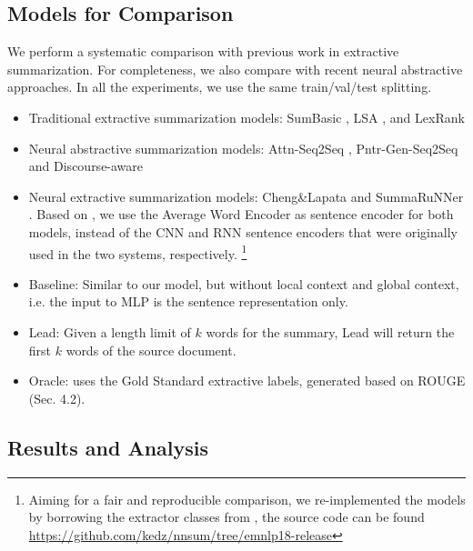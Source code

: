 \subsection{Models for Comparison}
We perform a systematic comparison with previous work in extractive summarization. For completeness, we also compare with recent neural abstractive approaches. In all the experiments, we use the same train/val/test splitting. 
\begin{itemize}
\setlength\itemsep{-0.3em}
\item Traditional extractive summarization models: SumBasic \cite{sumbasic}, LSA \cite{lsa}, and LexRank \cite{lexrank}
\item Neural abstractive summarization models: Attn-Seq2Seq \cite{RNN_beyond}, Pntr-Gen-Seq2Seq \cite{get_to_the_point} and Discourse-aware \cite{discourse_long_document}
\item Neural extractive summarization models: 
    Cheng\&Lapata \cite{cheng&lapata} and SummaRuNNer \cite{summarunner}. Based on 
    \cite{EMNLP2018}, we use the Average Word Encoder as sentence encoder for both models, instead of the CNN and RNN sentence encoders that were originally used in the two systems, respectively.
    \footnote{Aiming for a fair and reproducible comparison, we re-implemented the models by borrowing the extractor classes from \cite{EMNLP2018}, the source code can be found \url{https://github.com/kedz/nnsum/tree/emnlp18-release}}
\item Baseline: Similar to our model, but without local context and global context, i.e. the input to MLP is the sentence representation only.
\item Lead: Given a length limit of $k$ words for the summary, Lead will return the first $k$ words of the source document. 
\item Oracle: uses the Gold Standard extractive labels, generated based on ROUGE (Sec. 4.2).
\end{itemize}
\subsection{Results and Analysis}

